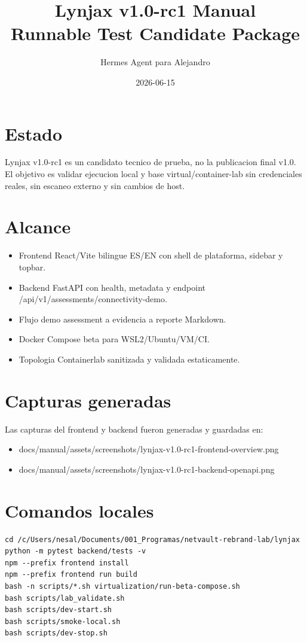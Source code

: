 \documentclass[11pt]{article}
\title{Lynjax v1.0-rc1 Manual\\Runnable Test Candidate Package}
\author{Hermes Agent para Alejandro}
\date{2026-06-15}
\begin{document}
\maketitle

\section*{Estado}
Lynjax v1.0-rc1 es un candidato tecnico de prueba, no la publicacion final v1.0. El objetivo es validar ejecucion local y base virtual/container-lab sin credenciales reales, sin escaneo externo y sin cambios de host.

\section{Alcance}
\begin{itemize}
  \item Frontend React/Vite bilingue ES/EN con shell de plataforma, sidebar y topbar.
  \item Backend FastAPI con health, metadata y endpoint /api/v1/assessments/connectivity-demo.
  \item Flujo demo assessment a evidencia a reporte Markdown.
  \item Docker Compose beta para WSL2/Ubuntu/VM/CI.
  \item Topologia Containerlab sanitizada y validada estaticamente.
\end{itemize}

\section{Capturas generadas}
Las capturas del frontend y backend fueron generadas y guardadas en:
\begin{itemize}
  \item docs/manual/assets/screenshots/lynjax-v1.0-rc1-frontend-overview.png
  \item docs/manual/assets/screenshots/lynjax-v1.0-rc1-backend-openapi.png
\end{itemize}

\section{Comandos locales}
\begin{verbatim}
cd /c/Users/nesal/Documents/001_Programas/netvault-rebrand-lab/lynjax
python -m pytest backend/tests -v
npm --prefix frontend install
npm --prefix frontend run build
bash -n scripts/*.sh virtualization/run-beta-compose.sh
bash scripts/lab_validate.sh
bash scripts/dev-start.sh
bash scripts/smoke-local.sh
bash scripts/dev-stop.sh
\end{verbatim}
\end{document}
